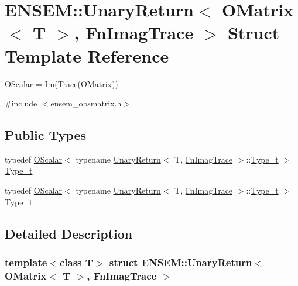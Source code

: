 \hypertarget{structENSEM_1_1UnaryReturn_3_01OMatrix_3_01T_01_4_00_01FnImagTrace_01_4}{}\section{E\+N\+S\+EM\+:\+:Unary\+Return$<$ O\+Matrix$<$ T $>$, Fn\+Imag\+Trace $>$ Struct Template Reference}
\label{structENSEM_1_1UnaryReturn_3_01OMatrix_3_01T_01_4_00_01FnImagTrace_01_4}


\mbox{\hyperlink{classENSEM_1_1OScalar}{O\+Scalar}} = Im(\+Trace(\+O\+Matrix))  




{\ttfamily \#include $<$ensem\+\_\+obsmatrix.\+h$>$}

\subsection*{Public Types}
\begin{DoxyCompactItemize}
\item 
typedef \mbox{\hyperlink{classENSEM_1_1OScalar}{O\+Scalar}}$<$ typename \mbox{\hyperlink{structENSEM_1_1UnaryReturn}{Unary\+Return}}$<$ T, \mbox{\hyperlink{structENSEM_1_1FnImagTrace}{Fn\+Imag\+Trace}} $>$\+::\mbox{\hyperlink{structENSEM_1_1UnaryReturn_3_01OMatrix_3_01T_01_4_00_01FnImagTrace_01_4_a7b4a608d50b5637e2ca0d51ba6ff692b}{Type\+\_\+t}} $>$ \mbox{\hyperlink{structENSEM_1_1UnaryReturn_3_01OMatrix_3_01T_01_4_00_01FnImagTrace_01_4_a7b4a608d50b5637e2ca0d51ba6ff692b}{Type\+\_\+t}}
\item 
typedef \mbox{\hyperlink{classENSEM_1_1OScalar}{O\+Scalar}}$<$ typename \mbox{\hyperlink{structENSEM_1_1UnaryReturn}{Unary\+Return}}$<$ T, \mbox{\hyperlink{structENSEM_1_1FnImagTrace}{Fn\+Imag\+Trace}} $>$\+::\mbox{\hyperlink{structENSEM_1_1UnaryReturn_3_01OMatrix_3_01T_01_4_00_01FnImagTrace_01_4_a7b4a608d50b5637e2ca0d51ba6ff692b}{Type\+\_\+t}} $>$ \mbox{\hyperlink{structENSEM_1_1UnaryReturn_3_01OMatrix_3_01T_01_4_00_01FnImagTrace_01_4_a7b4a608d50b5637e2ca0d51ba6ff692b}{Type\+\_\+t}}
\end{DoxyCompactItemize}


\subsection{Detailed Description}
\subsubsection*{template$<$class T$>$\newline
struct E\+N\+S\+E\+M\+::\+Unary\+Return$<$ O\+Matrix$<$ T $>$, Fn\+Imag\+Trace $>$}

